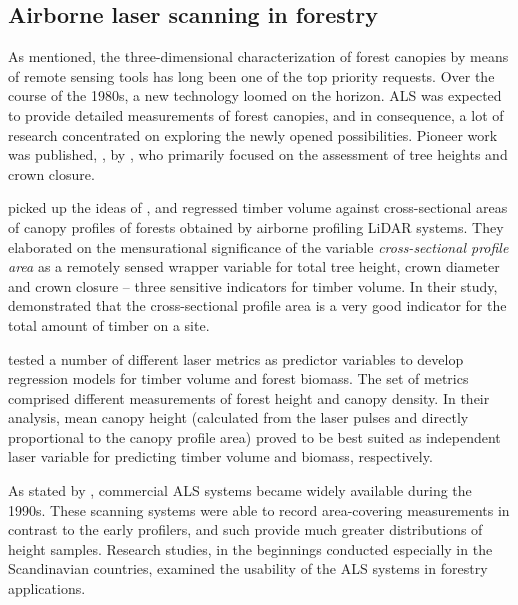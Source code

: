 \subsection{Airborne laser scanning in forestry}

As mentioned, the three-dimensional characterization of forest canopies by means of remote sensing tools 
has long been one of the top priority requests.
Over the course of the 1980s,  a new technology loomed on the horizon. 
\ac{ALS}  
was expected to provide detailed measurements of forest canopies, and in consequence, 
a lot of research concentrated on exploring the newly opened possibilities. 
Pioneer work was published, \eg, by \textcite{Nelson.1984, Aldred.1985}, who primarily focused on the assessment of tree heights and crown closure. 

\textcite{Maclean.1986}  
picked up the ideas of \textcite{Hugershoff.1933},
and regressed timber volume against cross-sectional areas of canopy profiles of forests obtained by airborne profiling \ac{LiDAR} systems.
They elaborated on the mensurational significance of the variable \emph{cross-sectional profile area} as a remotely sensed wrapper variable
for total tree height, crown diameter and crown closure -- three sensitive indicators for timber volume. 
In their study, \textcite{Maclean.1986} demonstrated that the cross-sectional profile area is a very good indicator for 
the total amount of timber on a site.

\textcite{Nelson.1988b} tested a number of different laser metrics as predictor variables 
to develop regression models for timber volume and forest biomass.
The set of metrics comprised different measurements of forest height and canopy density. 
In their analysis, mean canopy height (calculated from the laser pulses and directly proportional to the canopy profile area)
proved to be best suited as independent laser variable for predicting timber volume and biomass, respectively.

As stated by \textcite{Baltsavias.1999c}, commercial \ac{ALS} systems became widely available during the 1990s.
These scanning systems were able to record area-covering measurements in contrast to the early profilers, 
and such provide much greater distributions of height samples.  
Research studies, in the beginnings conducted especially in the Scandinavian countries, 
examined the usability of the \ac{ALS} systems in forestry applications.

